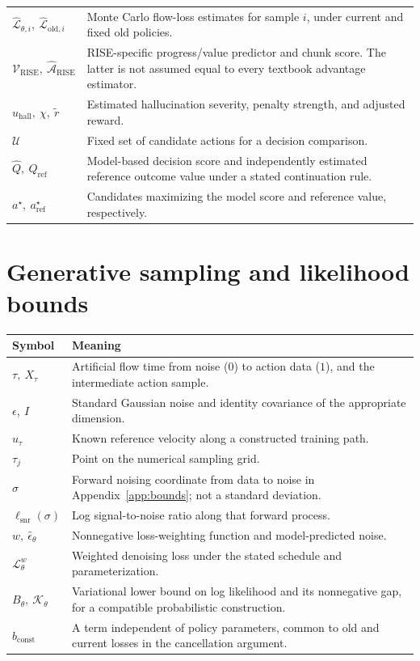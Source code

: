\begin{longtable}{@{}p{40mm}p{116mm}@{}}
$\widehat{\mathcal L}_{\theta,i},\ \widehat{\mathcal L}_{\mathrm{old},i}$ & Monte Carlo flow-loss estimates for sample $i$, under current and fixed old policies.\\
$\mathcal V_{\mathrm{RISE}},\ \widehat{\mathcal A}_{\mathrm{RISE}}$ & RISE-specific progress/value predictor and chunk score. The latter is not assumed equal to every textbook advantage estimator.\\
$u_{\mathrm{hall}},\ \chi,\ \widetilde r$ & Estimated hallucination severity, penalty strength, and adjusted reward.\\
$\mathcal U$ & Fixed set of candidate actions for a decision comparison.\\
$\widehat Q,\ Q_{\mathrm{ref}}$ & Model-based decision score and independently estimated reference outcome value under a stated continuation rule.\\
$a^\star,\ a_{\mathrm{ref}}^\star$ & Candidates maximizing the model score and reference value, respectively.\\
\bottomrule
\end{longtable}

\section*{Generative sampling and likelihood bounds}
\begin{longtable}{@{}p{40mm}p{116mm}@{}}
\toprule Symbol & Meaning\\\midrule\endhead
$\tau,\ X_\tau$ & Artificial flow time from noise ($0$) to action data ($1$), and the intermediate action sample.\\
$\epsilon,\ I$ & Standard Gaussian noise and identity covariance of the appropriate dimension.\\
$u_\tau$ & Known reference velocity along a constructed training path.\\
$\tau_j$ & Point on the numerical sampling grid.\\
$\sigma$ & Forward noising coordinate from data to noise in Appendix~\ref{app:bounds}; not a standard deviation.\\
$\ell_{\mathrm{snr}}(\sigma)$ & Log signal-to-noise ratio along that forward process.\\
$w,\ \widehat\epsilon_\theta$ & Nonnegative loss-weighting function and model-predicted noise.\\
$\mathcal L^w_\theta$ & Weighted denoising loss under the stated schedule and parameterization.\\
$B_\theta,\ \mathcal K_\theta$ & Variational lower bound on log likelihood and its nonnegative gap, for a compatible probabilistic construction.\\
$b_{\mathrm{const}}$ & A term independent of policy parameters, common to old and current losses in the cancellation argument.\\
\bottomrule
\end{longtable}

